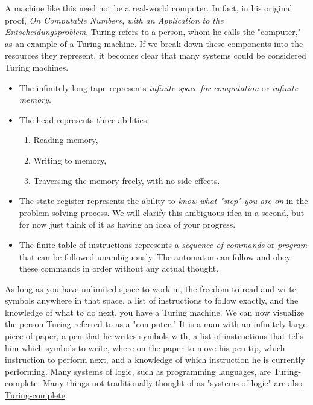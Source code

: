 A machine like this need not be a real-world computer. In fact, in his original proof, \textit{On Computable Numbers, with an Application to the Entscheidungsproblem}, Turing refers to a person, whom he calls the "computer," as an example of a Turing machine. If we break down these components into the resources they represent, it becomes clear that many systems could be considered Turing machines.

\vspace{4mm}
\begin{itemize}
    \item The infinitely long tape represents \textit{infinite space for computation} or \textit{infinite memory}.
    \item The head represents three abilities:
        \begin{enumerate}
            \item Reading memory,
            \item Writing to memory,
            \item Traversing the memory freely, with no side effects.
        \end{enumerate}
    \item The state register represents the ability to \textit{know what "step" you are on} in the problem-solving process. We will clarify this ambiguous idea in a second, but for now just think of it as having an idea of your progress.
    \item The finite table of instructions represents a \textit{sequence of commands} or \textit{program} that can be followed unambiguously. The automaton can follow and obey these commands in order without any actual thought.
\end{itemize}
\vspace{5mm}

As long as you have unlimited space to work in, the freedom to read and write symbols anywhere in that space, a list of instructions to follow exactly, and the knowledge of what to do next, you have a Turing machine. We can now visualize the person Turing referred to as a "computer." It is a man with an infinitely large piece of paper, a pen that he writes symbols with, a list of instructions that tells him which symbols to write, where on the paper to move his pen tip, which instruction to perform next, and a knowledge of which instruction he is currently performing. Many systems of logic, such as programming languages, are Turing-complete. Many things not traditionally thought of as "systems of logic" are \underline{also Turing-complete}.

